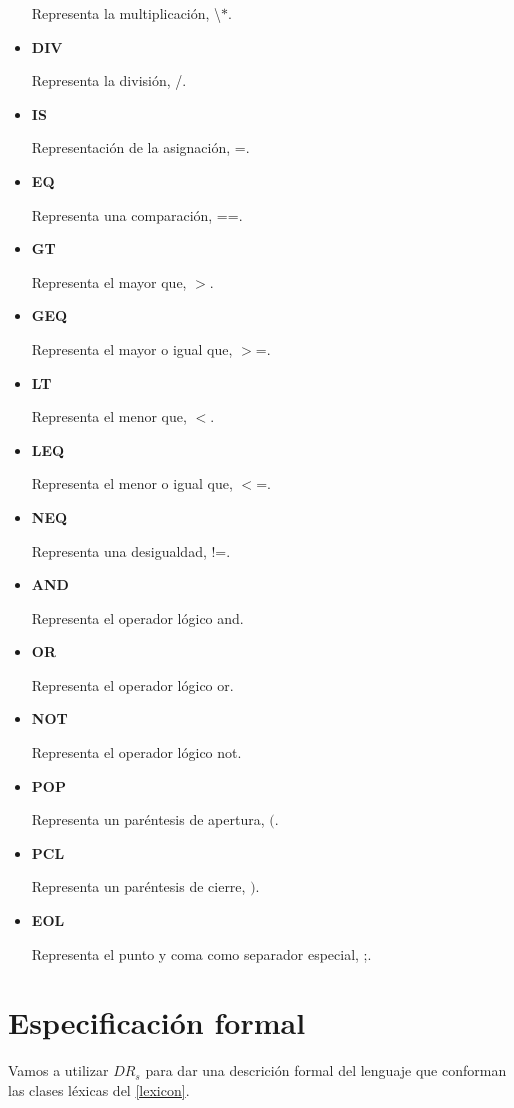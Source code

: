 \documentclass[\main/MemoriaPL.tex]{subfiles}
\begin{document}
\begin{itemize}
        \par
        Representa la multiplicación, \textbackslash $\ast$.
      \item \textbf{DIV}
        \par
        Representa la división, /.
      \item \textbf{IS}
        \par
        Representación de la asignación, =.
      \item \textbf{EQ}
        \par
        Representa una comparación, ==.
      \item \textbf{GT}
        \par
        Representa el mayor que, $>$.
      \item \textbf{GEQ}
        \par
        Representa el mayor o igual que, $>$=.
      \item \textbf{LT}
        \par
        Representa el menor que, $<$.
      \item \textbf{LEQ}
        \par
        Representa el menor o igual que, $<$=.
      \item \textbf{NEQ}
        \par
        Representa una desigualdad, !=.
      \item \textbf{AND}
        \par
        Representa el operador lógico and.
      \item \textbf{OR}
        \par
        Representa el operador lógico or.
      \item \textbf{NOT}
        \par
        Representa el operador lógico not.
      \item \textbf{POP}
        \par
        Representa un paréntesis de apertura, $($.
      \item \textbf{PCL}
        \par
        Representa un paréntesis de cierre, $)$.
      \item \textbf{EOL}
        \par
        Representa el punto y coma como separador especial, ;.
    \end{itemize}

  \section{Especificación formal}
    \par
    Vamos a utilizar $DR_s$ para dar una descrición formal del lenguaje que conforman las clases léxicas del \cref{lexicon}.
\end{document}
